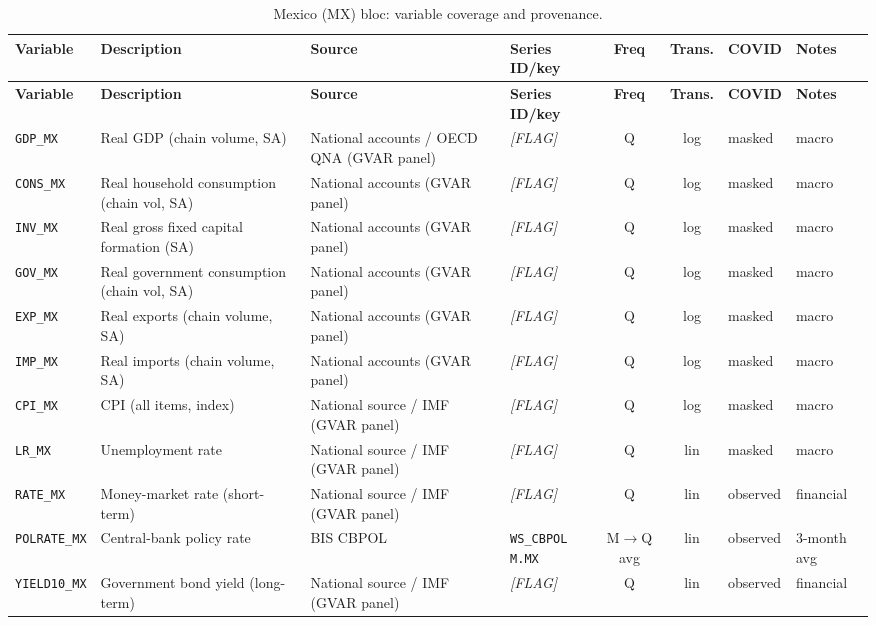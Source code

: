 {\footnotesize
\begin{longtable}{@{}llp{2.5cm}p{2.4cm}cclp{2.6cm}@{}}
\caption{Mexico (MX) bloc: variable coverage and provenance.}\label{tab:data:MX}\\
\toprule
\textbf{Variable} & \textbf{Description} & \textbf{Source} & \textbf{Series ID/key} & \textbf{Freq} & \textbf{Trans.} & \textbf{COVID} & \textbf{Notes} \\
\midrule
\endfirsthead
\toprule
\textbf{Variable} & \textbf{Description} & \textbf{Source} & \textbf{Series ID/key} & \textbf{Freq} & \textbf{Trans.} & \textbf{COVID} & \textbf{Notes} \\
\midrule
\endhead
\bottomrule
\endfoot
\texttt{GDP\_MX}  & Real GDP (chain volume, SA) & National accounts / OECD QNA (GVAR panel) & \textit{[FLAG]} & Q & log & masked & macro \\
\texttt{CONS\_MX} & Real household consumption (chain vol, SA) & National accounts (GVAR panel) & \textit{[FLAG]} & Q & log & masked & macro \\
\texttt{INV\_MX}  & Real gross fixed capital formation (SA) & National accounts (GVAR panel) & \textit{[FLAG]} & Q & log & masked & macro \\
\texttt{GOV\_MX}  & Real government consumption (chain vol, SA) & National accounts (GVAR panel) & \textit{[FLAG]} & Q & log & masked & macro \\
\texttt{EXP\_MX}  & Real exports (chain volume, SA) & National accounts (GVAR panel) & \textit{[FLAG]} & Q & log & masked & macro \\
\texttt{IMP\_MX}  & Real imports (chain volume, SA) & National accounts (GVAR panel) & \textit{[FLAG]} & Q & log & masked & macro \\
\texttt{CPI\_MX}  & CPI (all items, index) & National source / IMF (GVAR panel) & \textit{[FLAG]} & Q & log & masked & macro \\
\texttt{LR\_MX}   & Unemployment rate & National source / IMF (GVAR panel) & \textit{[FLAG]} & Q & lin & masked & macro \\
\texttt{RATE\_MX} & Money-market rate (short-term) & National source / IMF (GVAR panel) & \textit{[FLAG]} & Q & lin & observed & financial \\
\texttt{POLRATE\_MX} & Central-bank policy rate & BIS CBPOL & \texttt{WS\_CBPOL M.MX} & M$\to$Q avg & lin & observed & 3-month avg \\
\texttt{YIELD10\_MX} & Government bond yield (long-term) & National source / IMF (GVAR panel) & \textit{[FLAG]} & Q & lin & observed & financial \\

\end{longtable}}
